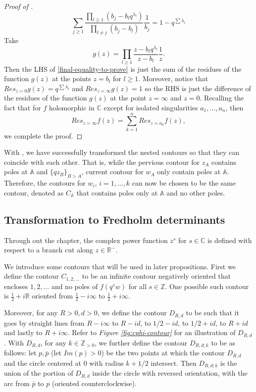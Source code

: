 \begin{proof}[Proof of ]
\begin{equation}
\label{final-equality-to-prove}
\sum_{j \ge 1} \frac{\prod_{l \ge 1} (b_j - b_l q^{\lambda_l})}{\prod_{l \neq j} (b_j - b_l)} \frac{1}{b_j} = 1 - q^{\sum \lambda_i}
\end{equation}
Take $$g(z) = \prod_{l \ge 1} \frac{z - b_l q^{\lambda_l}}{z - b_l} \frac{1}{z}.$$ Then the LHS of \eqref{final-equality-to-prove} is just the sum of the residues of the function $g(z)$ at the points $z = b_l$ for $l \ge 1$. Moreover, notice that $Res_{z = 0} g(z) = q^{\sum \lambda_l}$ and $Res_{z = \infty} g(z) = 1$ so the RHS is just the difference of the residues of the function $g(z)$ at the point $z = \infty$ and $z = 0$. Recalling the fact that for $f$ holomorphic in $\mathbb{C}$ except for isolated singularities $a_1, \dots, a_n$, then $$Res_{z = \infty} f(z) = \sum_{k = 1}^{n} Res_{z = a_k} f(z),$$ we complete the proof.
\end{proof}

With , we have successfully transformed the nested contours so that they can coincide with each other. That is, while the pervious contour for $z_A$ contains poles at $\mathbb{A}$ and $\{qz_B\}_{B>A}$, current contour for $w_A$ only contain poles at $\mathbb{A}$. Therefore, the contours for $w_i$, $i = 1, \dots, k$ can now be chosen to be the same contour, denoted as $C_{\mathbb{A}}$ that contains poles only at $\mathbb{A}$ and no other poles. 

\subsection{Transformation to Fredholm determinants}
\label{transformation-to-fd}
Through out the chapter, the complex power function $z^s$ for $s \in \mathbb{C}$ is defined with respect to a branch cut along $z \in \mathbb{R}^-$.

We introduce some contours that will be used in later propositions. First we define the contour $C_{1,2,\dots}$ to be an infinite contour negatively oriented that encloses $1,2,\dots$ and no poles of $f(q^sw)$ for all $s \in \mathbb{Z}$. One possible such contour is $\frac{1}{2} + i\mathbb{R}$ oriented from $\frac{1}{2} - i\infty$ to $\frac{1}{2} + i\infty$. 

Moreover, for any $R > 0, d > 0$, we define the contour $D_{R,d}$ to be such that it goes by straight lines from $R - i\infty$ to $R - i d$, to $1/2 - i d$, to $1/2 + id$, to $R + id$ and lastly to $R+i\infty$. Refer to \textit{Figure \ref{fig:cphi-contour}} for an illustration of $D_{R,d}$. With $D_{R,d}$, for any $k \in \mathbb{Z}_{>0}$, we further define the contour $D_{R,d;k}$ to be as follows: let $p, \bar{p}$ (let $Im(p) > 0$) be the two points at which the contour $D_{R,d}$ and the circle centered at 0 with radius $k+1/2$ intersect. Then $D_{R,d;k}$ is the union of the portion of $D_{R,d}$ inside the circle with reversed orientation, with the arc from $\bar{p}$ to $p$ (oriented counterclockwise). \\

